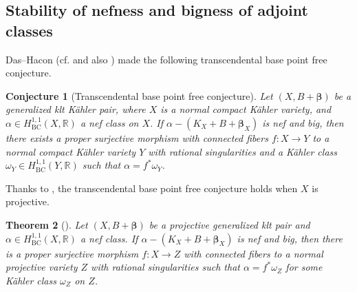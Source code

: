 \documentclass[12pt]{amsart}
\numberwithin{equation}{section}
\newtheorem{theorem} {Theorem} [section]
\theoremstyle{definition}
\theoremstyle{plain}
\newtheorem{conjecture}  [theorem]     {Conjecture}
\newtheorem*{thm A*}{Theorem A}
\newtheorem*{thm B*}{Theorem B}
\newtheorem*{thm C*}{Theorem C}
\newtheorem*{thm D*}{Theorem D}
\theoremstyle{definition}
\renewcommand{\1}{\mathds{1}}
\newcommand{\bbeta}{\boldsymbol{\beta}}
\renewcommand{\>}{\rightarrow}
\begin{document}
\subsection{Stability of nefness and bigness of adjoint classes}
Das--Hacon (cf. \cite[Conjecture 1.6]{DH24} and also \cite{TosatiKAWA}) made the following transcendental base point free conjecture. 
\begin{conjecture}[{Transcendental base point free conjecture}]\label{Transbpf}
Let $(X, B+\bbeta)$ be a generalized klt K\"ahler pair, where $X$ is a normal compact K\"ahler variety, and $\alpha \in H_{\mathrm{BC}}^{1,1}(X,\mathbb{R})$ a nef class on $X$. If $\alpha-\left(K_X+B+ \bbeta_X\right)$ is nef and big, then there exists a proper surjective morphism with connected fibers $f: X \rightarrow Y$ to a normal compact K\"ahler variety $Y$ with rational singularities and a K\"ahler class $\omega_Y \in H_{\mathrm{BC}}^{1,1}(Y,\mathbb{R})$ such that $\alpha=f^* \omega_Y$. 
\end{conjecture}

Thanks to \cite{DH24MMP}, the transcendental base point free conjecture holds when $X$ is projective.

\begin{theorem}[{\cite[Corollary~3.7]{DH24MMP}}]\label{DHTransbpf}
Let $(X, B+ \bbeta)$ be a projective generalized klt pair and $\alpha \in H_{\mathrm{BC}}^{1,1}(X,\mathbb{R})$ a nef class. If $\alpha-\left(K_X+B+ \bbeta_X\right)$ is nef and big, then there is a proper surjective morphism $f: X \rightarrow Z$ with connected fibers to a normal projective variety $Z$ with rational singularities such that $\alpha=f^* \omega_Z$ for some K\"ahler class $\omega_Z$ on $Z$.
\end{theorem}
\end{document}
